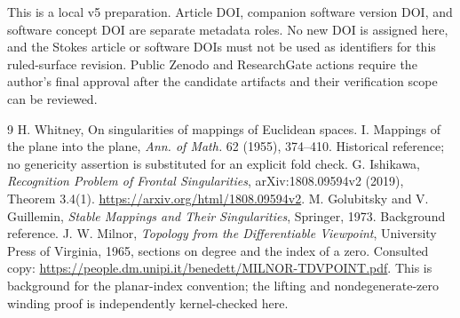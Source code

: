 \documentclass[11pt,a4paper]{article}
\theoremstyle{definition}\newtheorem{definition}[theorem]{Definition}
\theoremstyle{remark}\newtheorem{remark}[theorem]{Remark}
\begin{document}
This is a local v5 preparation. Article DOI, companion software version
DOI, and software concept DOI are separate metadata roles. No new DOI is
assigned here, and the Stokes article or software DOIs must not be used
as identifiers for this ruled-surface revision. Public Zenodo and ResearchGate actions require the author's final approval after the
candidate artifacts and their verification scope can be reviewed.

\begin{thebibliography}{9}
 H. Whitney, On singularities of mappings of Euclidean
spaces. I. Mappings of the plane into the plane, \emph{Ann. of Math.}
62 (1955), 374--410. Historical reference; no genericity assertion is
substituted for an explicit fold check.
 G. Ishikawa, \emph{Recognition Problem of Frontal
Singularities}, arXiv:1808.09594v2 (2019), Theorem 3.4(1).
\url{https://arxiv.org/html/1808.09594v2}.
 M. Golubitsky and V. Guillemin, \emph{Stable Mappings and
Their Singularities}, Springer, 1973. Background reference.
 J. W. Milnor, \emph{Topology from the Differentiable
Viewpoint}, University Press of Virginia, 1965, sections on degree and
the index of a zero. Consulted copy:
\url{https://people.dm.unipi.it/benedett/MILNOR-TDVPOINT.pdf}.
This is background for the planar-index convention; the lifting and
nondegenerate-zero winding proof is independently kernel-checked here.
\end{thebibliography}
\end{document}
